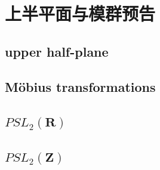 \section{上半平面与模群预告}
\label{b3:sec:1104}


\subsection{upper half-plane}
\label{b3:subsec:110401}

\subsection{Möbius transformations}
\label{b3:subsec:110402}

\subsection{\texorpdfstring{\(PSL_2(\mathbf R)\)}{PSL2()}}
\label{b3:subsec:110403}

\subsection{\texorpdfstring{\(PSL_2(\mathbf Z)\)}{PSL2()}}
\label{b3:subsec:110404}


